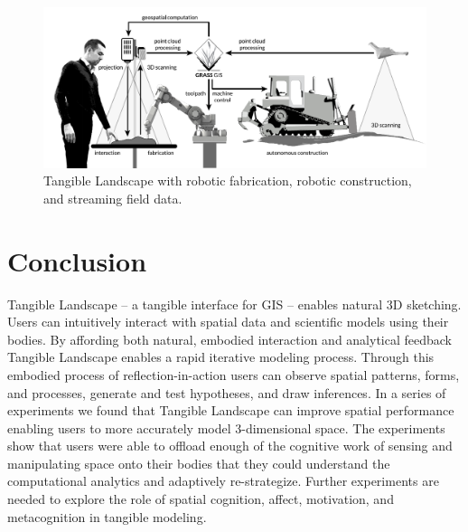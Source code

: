 \documentclass[prodmode,acmtochi]{acmsmall} %
\begin{document}
\begin{figure}
\begin{center}
\includegraphics[width=\textwidth]{images/system_schema_land.pdf}
\caption{Tangible Landscape with 
robotic fabrication, robotic construction, and streaming field data.}
\label{fig:system_schema_land}
\end{center}
\end{figure}

\section{Conclusion}
Tangible Landscape -- a tangible interface for GIS -- 
enables natural 3D sketching. %
%
Users can intuitively interact with 
spatial data and scientific models using their bodies. 
% 
By affording both natural, embodied interaction and analytical feedback
Tangible Landscape enables a
rapid iterative modeling process.
%
Through this embodied process of reflection-in-action 
users can 
observe spatial patterns, forms, and processes, 
generate and test hypotheses, 
and draw inferences. 
%
In a series of experiments we found that 
Tangible Landscape can improve spatial performance  
enabling users to more accurately model 3-dimensional space. 
%
The experiments show that users 
were able to offload enough of the cognitive work 
of sensing and manipulating space
onto their bodies
that they could understand the
computational analytics
and adaptively re-strategize.
%
Further experiments are needed
to explore the role of 
spatial cognition, affect, motivation, and metacognition 
in tangible modeling.


\end{document}

